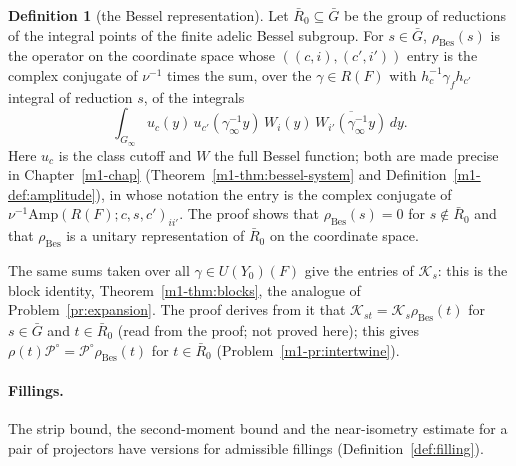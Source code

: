 \documentclass[reqno]{amsart}
\newcounter{chap}
\theoremstyle{definition}
\newtheorem{definition}{Definition}[section]
\theoremstyle{plain}
\theoremstyle{remark}
\newcommand{\Kc}{\mathcal K}
\newcommand{\Pc}{\mathcal P}
\newcommand{\Gb}{\bar G}
\newcommand{\Rb}{\bar R_0}
\newcommand{\rB}{\rho_{\mathrm{Bes}}}
\newcommand{\Amp}{\mathrm{Amp}}
\begin{document}
\begin{definition}[the Bessel representation]\label{def:bessel-rep}
Let \(\Rb\subseteq\Gb\) be the group of reductions of the integral points of the finite adelic Bessel subgroup.  For \(s\in\Gb\), \(\rB(s)\) is the operator on the coordinate space whose \(((c,i),(c',i'))\) entry is the complex conjugate of \(\nu^{-1}\) times the sum, over the \(\gamma\in R(F)\) with \(h_c^{-1}\gamma_fh_{c'}\) integral of reduction \(s\), of the integrals
\[
 \int_{G_\infty}u_c(y)\,u_{c'}(\gamma_\infty^{-1}y)\,W_i(y)\,\overline{W_{i'}(\gamma_\infty^{-1}y)}\,dy .
\]
Here \(u_c\) is the class cutoff and \(W\) the full Bessel function; both are made precise in Chapter~\ref{m1-chap} (Theorem~\ref{m1-thm:bessel-system} and Definition~\ref{m1-def:amplitude}), in whose notation the entry is the complex conjugate of \(\nu^{-1}\Amp(R(F);c,s,c')_{ii'}\).  The proof shows that \(\rB(s)=0\) for \(s\notin\Rb\) and that \(\rB\) is a unitary representation of \(\Rb\) on the coordinate space.
\end{definition}

The same sums taken over all \(\gamma\in U(Y_0)(F)\) give the entries of \(\Kc_s\): this is the block identity, Theorem~\ref{m1-thm:blocks}, the analogue of Problem~\ref{pr:expansion}.  The proof derives from it that \(\Kc_{st}=\Kc_s\rB(t)\) for \(s\in\Gb\) and \(t\in\Rb\) (read from the proof; not proved here); this gives \(\rho(t)\Pc^\circ=\Pc^\circ\rB(t)\) for \(t\in\Rb\) (Problem~\ref{m1-pr:intertwine}).

\paragraph{Fillings.}  The strip bound, the second-moment bound and the near-isometry estimate for a pair of projectors have versions for admissible fillings (Definition~\ref{def:filling}).
\end{document}
